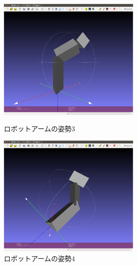 \documentclass[a4paper,10pt]{jsarticle}
\begin{document}
\begin{figure}[b]
 \begin{minipage}{0.5\hsize}
  \begin{center}
   \includegraphics[width=70mm, bb = 0 0 1333 1142]{fig/png/arm3.png}
  \end{center}
  \caption{ロボットアームの姿勢3}
  \label{fig:ロボットアームの姿勢3}
 \end{minipage}
 \begin{minipage}{0.5\hsize}
  \begin{center}
   \includegraphics[width=70mm, bb = 0 0 1333 1142]{fig/png/arm4.png}
  \end{center}
  \caption{ロボットアームの姿勢4}
  \label{fig:ロボットアームの姿勢4}
 \end{minipage}
\end{figure}
\end{document}
